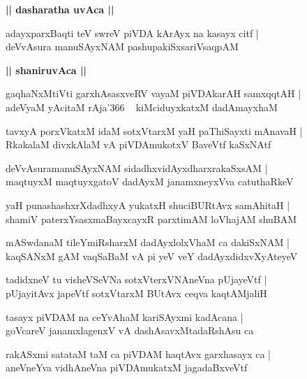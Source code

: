 \documentclass[twoside,12pt,openright]{book}
\newcounter{shloka}[chapter]
\def\uvaca#1{\centerline{{\large\textbf{#1}}}}
\begin{document}
\uvaca{|| dasharatha uvAca ||}

\begin{shloka}%
adayxparxBaqti teV swreV piVDA kArAyx na kasayx citf |\\
deVvAsura manuSAyxNAM pashupakiSxsariVsaqpAM 
\end{shloka}

\uvaca{|| shaniruvAca ||}

\begin{shloka}%
gaqhaNxMtiVti garxhAsasxveRV vayaM piVDAkarAH samxqqtAH |\\
adeVyaM yAcitaM rAja\char'366 ~ kiMciduyxkatxM dadAmayxhaM
\end{shloka}

\begin{shloka}%
tavxyA porxVkatxM idaM sotxVtarxM yaH paThiSayxti mAnavaH |\\
RkakalaM divxkAlaM vA piVDAmukotxV BaveVtf kaSxNAtf
\end{shloka}

\begin{shloka}%
deVvAsuramanuSAyxNAM sidadhxvidAyxdharxrakaSxsAM |\\
maqtuyxM maqtuyxgatoV dadAyxM janamxneyxVva catuthaRkeV 
\end{shloka}

\begin{shloka}%
yaH punashashxrXdadhxyA yukatxH shuciBURtAvx samAhitaH |\\
shamiV paterxYsasxmaBayxcayxR parxtimAM loVhajAM shuBAM 
\end{shloka}

\begin{shloka}%
mASwdanaM tileYmiRsharxM dadAyxlolxVhaM ca dakiSxNAM |\\
kaqSANxM gAM vaqSaBaM vA pi yeV veY dadAyxdidxvXyAteyeV 
\end{shloka}

\begin{shloka}%
tadidxneV tu visheVSeVNa sotxVterxVNAneVna pUjayeVtf |\\
pUjayitAvx japeVtf sotxVtarxM BUtAvx ceqva kaqtAMjaliH
\end{shloka}

\begin{shloka}%
tasayx piVDAM na ceYvAhaM kariSAyxmi kadAcana |\\
goVcareV janamxlagenxV vA dashAsavxMtadaRshAsu ca 
\end{shloka}

\begin{shloka}%
rakASxmi satataM taM ca piVDAM haqtAvx garxhasayx ca |\\
aneVneYva vidhAneVna piVDAmukatxM jagadaBxveVtf
\end{shloka}
\end{document}
